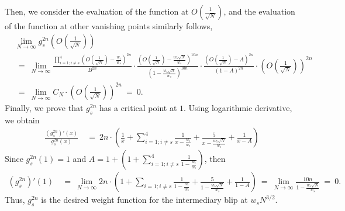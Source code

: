 \documentclass[11pt,reqno]{amsart}
\numberwithin{equation}{section}
\theoremstyle{plain}
\begin{document}
Then, we consider the evaluation of the function at $O\left(\frac{1}{\sqrt{N}}\right)$, and the evaluation of the function at other vanishing points similarly follows,
\begin{align}
&\lim_{N\rightarrow\infty}g_s^{2n}\left(O\left(\frac{1}{\sqrt{N}}\right)\right) \nonumber \\
&\ = \ \lim_{N\rightarrow\infty}\frac{\prod_{i=1;i\neq s}^4 \left(O\left(\frac{1}{\sqrt{N}}\right)-\frac{w_i}{w_s}\right)^{2n}}{B^{2n}}\cdot \frac{\left(O\left(\frac{1}{\sqrt{N}}\right)-\frac{w_5\sqrt{N}}{w_s}\right)^{10n}}{\left(1-\frac{w_5\sqrt{N}}{w_s}\right)^{10n}}\cdot \frac{\left(O\left(\frac{1}{\sqrt{N}}\right)-A\right)^{2n}}{(1-A)^{2n}} \cdot \left(O\left(\frac{1}{\sqrt{N}}\right)\right)^{2n}
\nonumber \\
&\ = \ \lim_{N\rightarrow\infty} C_N \cdot \left(O\left(\frac{1}{\sqrt{N}}\right)\right)^{2n} \ = \ 0.
\end{align}
Finally, we prove that $g_s^{2n}$ has a critical point at $1$. Using logarithmic derivative, we obtain
\begin{align}
\frac{(g_s^{2n})'(x)}{g_s^{2n}(x)} &\ = \ 2n \cdot \left(\frac{1}{x}+\sum_{i=1;i\neq s}^4\frac{1}{x-\frac{w_i}{w_s}}+\frac{5}{x-\frac{w_5\sqrt{N}}{w_s}}+\frac{1}{x-A}\right)
\end{align}
Since $g_s^{2n}(1)=1$ and $A=1+\left(1+\sum_{i=1;i\neq s}^4\frac{1}{1-\frac{w_i}{w_s}}\right)$, then
\begin{align}
(g_s^{2n})'(1) &\ = \ \lim_{N\rightarrow\infty} 2n \cdot \left(1+\sum_{i=1;i\neq s}\frac{1}{1-\frac{w_i}{w_s}}+\frac{5}{1-\frac{w_5\sqrt{N}}{w_s}}+\frac{1}{1-A}\right) \ = \ \lim_{N\rightarrow\infty}\frac{10n}{1-\frac{w_5\sqrt{N}}{w_s}} \ = \ 0.
\end{align}
Thus, $g_s^{2n}$ is the desired weight function for the intermediary blip at $w_sN^{3/2}$.

\end{document}
